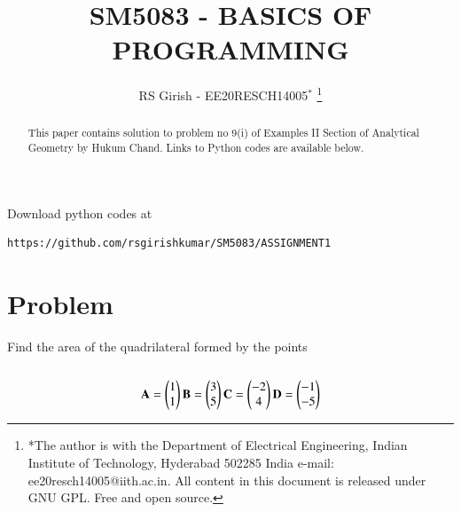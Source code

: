 \documentclass[journal,12pt,twocolumn]{IEEEtran}
\begin{document}
\makeatletter
{}
\makeatother
\let\StandardTheFigure\thefigure
\let\vec\mathbf
\renewcommand{\thefigure}{\theproblem}
\def\putbox#1#2#3{\makebox[0in][l]{\makebox[#1][l]{}\raisebox{\baselineskip}[0in][0in]{\raisebox{#2}[0in][0in]{#3}}}}
     \def\rightbox#1{\makebox[0in][r]{#1}}
     \def\centbox#1{\makebox[0in]{#1}}
     \def\topbox#1{\raisebox{-\baselineskip}[0in][0in]{#1}}
     \def\midbox#1{\raisebox{-0.5\baselineskip}[0in][0in]{#1}}
\vspace{3cm}
\title{
SM5083 - BASICS OF PROGRAMMING
	}
\author{ RS Girish - EE20RESCH14005$^{*}$%
\thanks{*The author is with the Department
		of Electrical Engineering, Indian Institute of Technology, Hyderabad
		502285 India e-mail:  ee20resch14005@iith.ac.in. All content in this document is released under GNU GPL.  Free and open source.}
	}
\maketitle
\newpage
\tableofcontents
\bigskip
\renewcommand{\thefigure}{\theenumi}
\renewcommand{\thetable}{\theenumi}
\begin{abstract}
This paper contains solution to problem no 9(i) of Examples II Section of Analytical Geometry by Hukum Chand.
Links to Python codes are available below.  
\end{abstract}
Download python codes at 
\begin{lstlisting}
https://github.com/rsgirishkumar/SM5083/ASSIGNMENT1
\end{lstlisting}
\section{Problem}
Find the area of the quadrilateral formed by the points\\
\\
\begin{align}
\begin{split}
\vec{A} = \myvec{1 \\ 1}
\vec{B} = \myvec{3 \\ 5}
\vec{C} = \myvec{-2 \\ 4}
\vec{D} = \myvec{-1 \\ -5}
\end{split}
\end{align}
\end{document}
